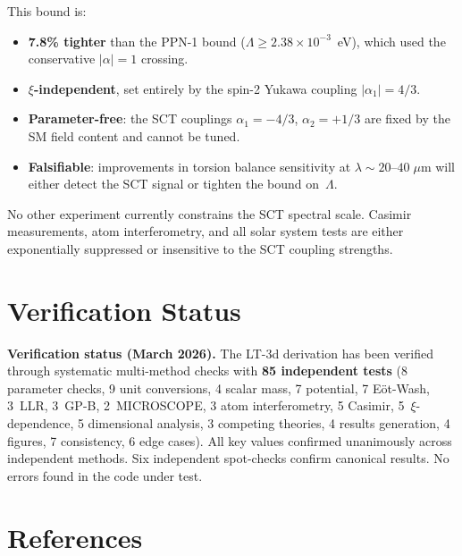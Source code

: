 \documentclass[11pt,a4paper]{article}
\begin{document}
This bound is:
\begin{itemize}[leftmargin=2em]
  \item \textbf{7.8\% tighter} than the PPN-1 bound ($\Lambda \geq 2.38 \times
    10^{-3}$~eV), which used the conservative $|\alpha| = 1$ crossing.
  \item \textbf{$\xi$-independent}, set entirely by the spin-2 Yukawa coupling
    $|\alpha_1| = 4/3$.
  \item \textbf{Parameter-free}: the SCT couplings $\alpha_1 = -4/3$,
    $\alpha_2 = +1/3$ are fixed by the SM field content and cannot be tuned.
  \item \textbf{Falsifiable}: improvements in torsion balance sensitivity at
    $\lambda \sim 20$--$40\;\mu$m will either detect the SCT signal or tighten
    the bound on~$\Lambda$.
\end{itemize}

No other experiment currently constrains the SCT spectral scale. Casimir
measurements, atom interferometry, and all solar system tests are either
exponentially suppressed or insensitive to the SCT coupling strengths.

\section{Verification Status}
\label{sec:verification}

\begin{center}
  \colorbox{statusgreen!10}{\parbox{0.82\textwidth}{
    \textbf{\color{statusgreen} Verification status (March 2026).}
    The LT-3d derivation has been verified through systematic multi-method checks
    with \textbf{85 independent tests}
    (8 parameter checks, 9 unit conversions, 4 scalar mass, 7 potential,
    7 E\"ot-Wash, 3~LLR, 3~GP-B, 2~MICROSCOPE, 3 atom interferometry,
    5 Casimir, 5~$\xi$-dependence, 5 dimensional analysis, 3 competing theories,
    4 results generation, 4 figures, 7 consistency, 6 edge cases).
    All key values confirmed unanimously across independent methods.
    Six independent spot-checks confirm canonical results.
    No errors found in the code under test.
  }}
\end{center}

\section*{References}
\end{document}
